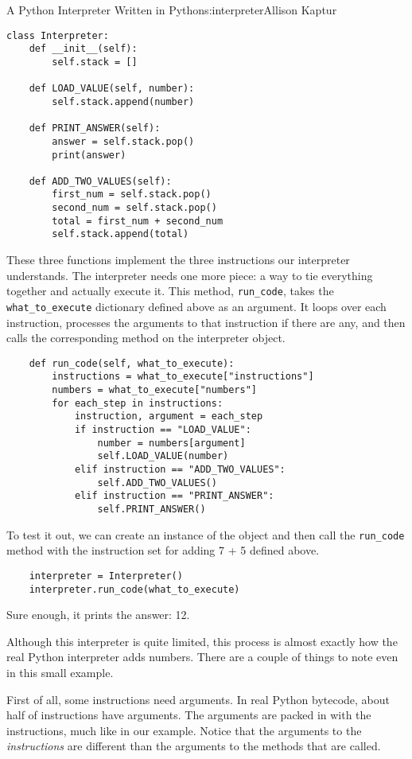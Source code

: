 \begin{aosachapter}{A Python Interpreter Written in Python}{s:interpreter}{Allison Kaptur}
\begin{verbatim}
class Interpreter:
    def __init__(self):
        self.stack = []

    def LOAD_VALUE(self, number):
        self.stack.append(number)

    def PRINT_ANSWER(self):
        answer = self.stack.pop()
        print(answer)

    def ADD_TWO_VALUES(self):
        first_num = self.stack.pop()
        second_num = self.stack.pop()
        total = first_num + second_num
        self.stack.append(total)
\end{verbatim}

These three functions implement the three instructions our interpreter
understands. The interpreter needs one more piece: a way to tie
everything together and actually execute it. This method,
\texttt{run\_code}, takes the \texttt{what\_to\_execute} dictionary
defined above as an argument. It loops over each instruction, processes
the arguments to that instruction if there are any, and then calls the
corresponding method on the interpreter object.

\begin{verbatim}
    def run_code(self, what_to_execute):
        instructions = what_to_execute["instructions"]
        numbers = what_to_execute["numbers"]
        for each_step in instructions:
            instruction, argument = each_step
            if instruction == "LOAD_VALUE":
                number = numbers[argument]
                self.LOAD_VALUE(number)
            elif instruction == "ADD_TWO_VALUES":
                self.ADD_TWO_VALUES()
            elif instruction == "PRINT_ANSWER":
                self.PRINT_ANSWER()
\end{verbatim}

To test it out, we can create an instance of the object and then call
the \texttt{run\_code} method with the instruction set for adding 7 + 5
defined above.

\begin{verbatim}
    interpreter = Interpreter()
    interpreter.run_code(what_to_execute)
\end{verbatim}

Sure enough, it prints the answer: 12.

Although this interpreter is quite limited, this process is almost
exactly how the real Python interpreter adds numbers. There are a couple
of things to note even in this small example.

First of all, some instructions need arguments. In real Python bytecode,
about half of instructions have arguments. The arguments are packed in
with the instructions, much like in our example. Notice that the
arguments to the \emph{instructions} are different than the arguments to
the methods that are called.


\end{aosachapter}
